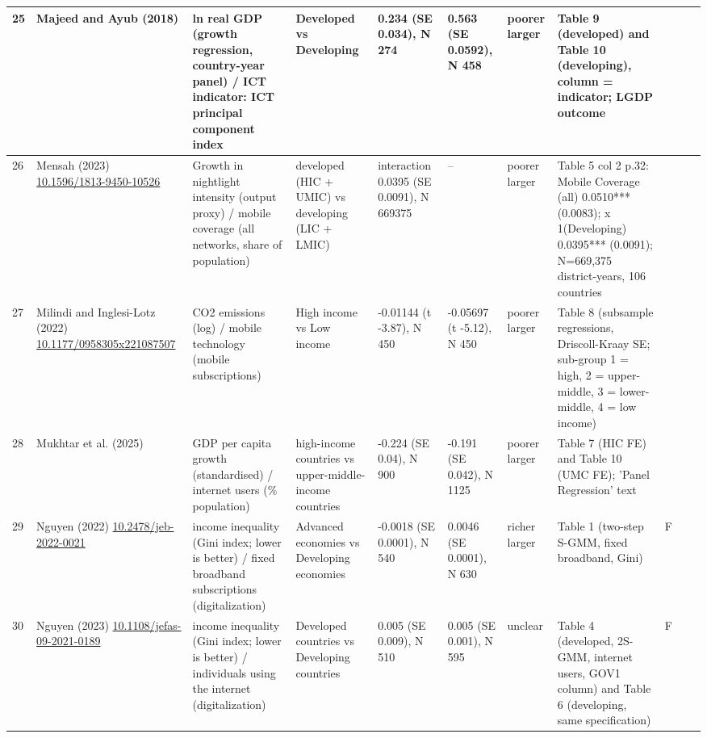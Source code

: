 \documentclass[10pt,a4paper]{article}
\begin{document}
\begin{longtable}{@{}p{0.4cm}p{2.4cm}p{2.6cm}p{3.0cm}p{2.6cm}p{2.6cm}p{1.5cm}p{5.6cm}p{0.3cm}p{1.0cm}p{1.6cm}@{}}
25 & Majeed and Ayub (2018) & ln real GDP (growth regression, country-year panel) / ICT indicator: ICT principal component index & Developed vs Developing & 0.234 (SE 0.034), N 274 & 0.563 (SE 0.0592), N 458 & poorer larger & Table 9 (developed) and Table 10 (developing), column = indicator; LGDP outcome &  &  &  \\ \midrule
26 & Mensah (2023) \newline \url{10.1596/1813-9450-10526} & Growth in nightlight intensity (output proxy) / mobile coverage (all networks, share of population) & developed (HIC + UMIC) vs developing (LIC + LMIC) & interaction 0.0395 (SE 0.0091), N 669375 & -- & poorer larger & Table 5 col 2 p.32: Mobile Coverage (all) 0.0510*** (0.0083); x 1(Developing) 0.0395*** (0.0091); N=669,375 district-years, 106 countries &  &  &  \\ \midrule
27 & Milindi and Inglesi-Lotz (2022) \newline \url{10.1177/0958305x221087507} & CO2 emissions (log) / mobile technology (mobile subscriptions) & High income vs Low income & -0.01144 (t -3.87), N 450 & -0.05697 (t -5.12), N 450 & poorer larger & Table 8 (subsample regressions, Driscoll-Kraay SE; sub-group 1 = high, 2 = upper-middle, 3 = lower-middle, 4 = low income) &  &  &  \\ \midrule
28 & Mukhtar et al. (2025) & GDP per capita growth (standardised) / internet users (\% population) & high-income countries vs upper-middle-income countries & -0.224 (SE 0.04), N 900 & -0.191 (SE 0.042), N 1125 & poorer larger & Table 7 (HIC FE) and Table 10 (UMC FE); 'Panel Regression' text &  &  &  \\ \midrule
29 & Nguyen (2022) \newline \url{10.2478/jeb-2022-0021} & income inequality (Gini index; lower is better) / fixed broadband subscriptions (digitalization) & Advanced economies vs Developing economies & -0.0018 (SE 0.0001), N 540 & 0.0046 (SE 0.0001), N 630 & richer larger & Table 1 (two-step S-GMM, fixed broadband, Gini) & F &  &  \\ \midrule
30 & Nguyen (2023) \newline \url{10.1108/jefas-09-2021-0189} & income inequality (Gini index; lower is better) / individuals using the internet (digitalization) & Developed countries vs Developing countries & 0.005 (SE 0.009), N 510 & 0.005 (SE 0.001), N 595 & unclear & Table 4 (developed, 2S-GMM, internet users, GOV1 column) and Table 6 (developing, same specification) & F &  &  \\ \midrule

\end{longtable}
\end{document}
